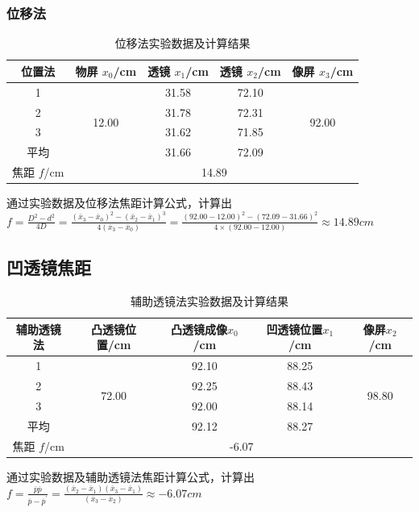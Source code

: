 \documentclass[12pt,a4paper]{article}
\begin{document}
			\subsubsection{位移法}
				\begin{table}[h]
				\centering
				\renewcommand{\arraystretch}{1.2}
				\begin{tabular}{|c|c|c|c|c|}
					\hline
					位置法 & 物屏 $x_0$/cm & 透镜 $x_1$/cm & 透镜 $x_2$/cm & 像屏 $x_3$/cm \\
					\hline
					1 & \multirow{4}{*}{12.00} & 31.58 & 72.10 & \multirow{4}{*}{92.00} \\
					\cline{1-1} \cline{3-4}
					2 &  & 31.78 & 72.31 &  \\
					\cline{1-1} \cline{3-4}
					3 &  & 31.62 & 71.85 &  \\
					\cline{1-1} \cline{3-4}
					平均 &  & 31.66 & 72.09 &  \\
					\hline
					焦距 $f$/cm & \multicolumn{4}{c|}{14.89} \\
					\hline
				\end{tabular}
				\caption{位移法实验数据及计算结果}
			\end{table}
			通过实验数据及位移法焦距计算公式，计算出
			$f = \frac{D^2 - d^2}{4D} = \frac{(\bar{x}_{3}-\bar{x}_{0})^{2}-(\bar{x}_{2}-\bar{x}_{1})^{3}}{4(\bar{x}_{3}-\bar{x}_{0})} = \frac{(92.00-12.00)^2-(72.09-31.66)^2}{4 \times (92.00-12.00)} \approx 14.89cm$

		\subsection{凹透镜焦距}	
			\begin{table}[H]
			\centering
			\renewcommand{\arraystretch}{1.2}
			\begin{tabular}{|c|c|c|c|c|}
				\hline
				辅助透镜法 & 凸透镜位置/cm & 凸透镜成像$x_0$/cm & 凹透镜位置$x_1$/cm & 像屏$x_2$/cm \\
				\hline
				1 & \multirow{4}{*}{72.00} & 92.10 & 88.25 & \multirow{4}{*}{98.80} \\
				\cline{1-1} \cline{3-4}
				2 &  & 92.25 & 88.43 &  \\
				\cline{1-1} \cline{3-4}
				3 &  & 92.00 & 88.14 &  \\
				\cline{1-1} \cline{3-4}
				平均 &  & 92.12 & 88.27 &  \\
				\hline
				焦距 $f$/cm & \multicolumn{4}{c|}{-6.07} \\
				\hline
			\end{tabular}
			\caption{辅助透镜法实验数据及计算结果}
			\end{table}
			通过实验数据及辅助透镜法焦距计算公式，计算出
			$f=\frac{\overline{p}\overline{p}}{\overline{p}-\overline{p}^{\prime}}=\frac{(\overline{x}_{2}-\overline{x}_{1})(\overline{x}_{3}-\overline{x}_{1})}{(\overline{x}_{3}-\overline{x}_{2})} \approx -6.07cm$
\end{document}
